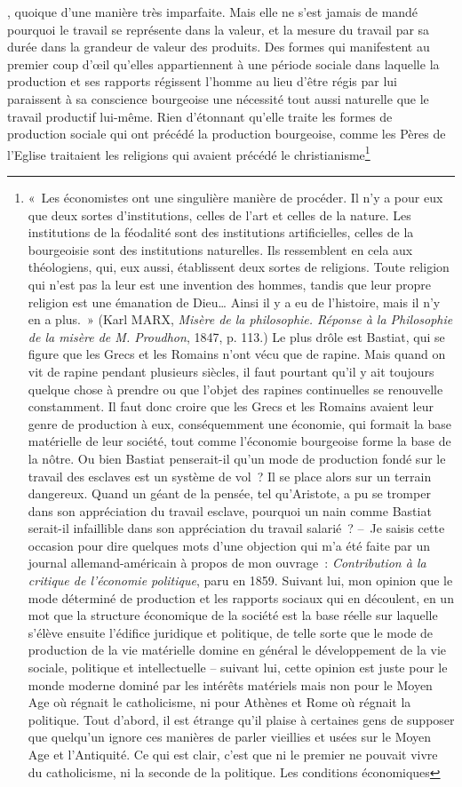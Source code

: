 \documentclass[french,twoside]{book} %
\begin{document}
{}, quoique d’une manière très imparfaite. Mais elle ne s’est jamais de mandé pourquoi le travail se représente dans la valeur, et la mesure du travail par sa durée dans la grandeur de valeur des produits. Des formes qui manifestent au premier coup d’œil qu’elles appartiennent à une période sociale dans laquelle la production et ses rapports régissent l’homme au lieu d’être régis par lui paraissent à sa conscience bourgeoise une nécessité tout aussi naturelle que le travail productif lui-même. Rien d’étonnant qu’elle traite les formes de production sociale qui ont précédé la production bourgeoise, comme les Pères de l’Eglise traitaient les religions qui avaient précédé le christianisme\footnote{« Les économistes ont une singulière manière de procéder. Il n’y a pour eux que deux sortes d’institutions, celles de l’art et celles de la nature. Les institutions de la féodalité sont des institutions artificielles, celles de la bourgeoisie sont des institutions naturelles. Ils ressemblent en cela aux théologiens, qui, eux aussi, établissent deux sortes de religions. Toute religion qui n’est pas la leur est une invention des hommes, tandis que leur propre religion est une émanation de Dieu… Ainsi il y a eu de l’histoire, mais il n’y en a plus. » (Karl MARX, \emph{Misère de la philosophie. Réponse à la Philosophie de la misère de M. Proudhon}, 1847, p. 113.) Le plus drôle est Bastiat, qui se figure que les Grecs et les Romains n’ont vécu que de rapine. Mais quand on vit de rapine pendant plusieurs siècles, il faut pourtant qu’il y ait toujours quelque chose à prendre ou que l’objet des rapines continuelles se renouvelle constamment. Il faut donc croire que les Grecs et les Romains avaient leur genre de production à eux, conséquemment une économie, qui formait la base matérielle de leur société, tout comme l’économie bourgeoise forme la base de la nôtre. Ou bien Bastiat penserait-il qu’un mode de production fondé sur le travail des esclaves est un système de vol ? Il se place alors sur un terrain dangereux. Quand un géant de la pensée, tel qu’Aristote, a pu se tromper dans son appréciation du travail esclave, pourquoi un nain comme Bastiat serait-il infaillible dans son appréciation du travail salarié ? – Je saisis cette occasion pour dire quelques mots d’une objection qui m’a été faite par un journal allemand-américain à propos de mon ouvrage : \emph{Contribution à la critique de l’économie politique}, paru en 1859. Suivant lui, mon opinion que le mode déterminé de production et les rapports sociaux qui en découlent, en un mot que la structure économique de la société est la base réelle sur laquelle s’élève ensuite l’édifice juridique et politique, de telle sorte que le mode de production de la vie matérielle domine en général le développement de la vie sociale, politique et intellectuelle – suivant lui, cette opinion est juste pour le monde moderne dominé par les intérêts matériels mais non pour le Moyen Age où régnait le catholicisme, ni pour Athènes et Rome où régnait la politique. Tout d’abord, il est étrange qu’il plaise à certaines gens de supposer que quelqu’un ignore ces manières de parler vieillies et usées sur le Moyen Age et l’Antiquité. Ce qui est clair, c’est que ni le premier ne pouvait vivre du catholicisme, ni la seconde de la politique. Les conditions économiques }
\end{document}
